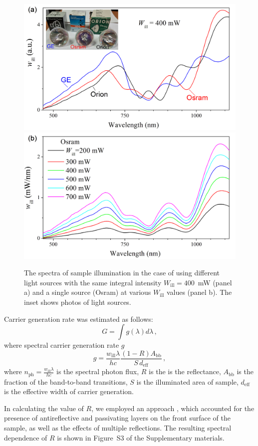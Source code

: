 \documentclass{WileyMSP-template}
\begin{document}
\begin{figure}
\centering
  \includegraphics[width=0.4\linewidth]{Fig4a.png}
  \includegraphics[width=0.4\linewidth]{Fig4b.png}
  \caption{
  The spectra of sample illumination in the case of using different light sources
  with the same integral intensity $W_\mathrm{ill}=400$~mW (panel a) and a single source (Osram)
 at various $W_\mathrm{ill}$ values (panel b).
 The inset shows photos of light sources.
}
  \label{fig4}
\end{figure}


Carrier generation rate was estimated as follows:
\begin{equation}
\label{eqGint}
G=\int g(\lambda) d\lambda\,,
\end{equation}
where spectral carrier generation rate $g$
\begin{equation}
\label{eqGspectr}
g=\frac{w_\mathrm{ill}\lambda}{hc}\frac{(1-R)A_\mathrm{bb}}{S\,d_\mathrm{eff}}\,,
\end{equation}
where $n_\mathrm{ph}=\frac{w_\mathrm{ill}\lambda}{hc}$ is the spectral photon flux,
$R$ is the is the reflectance,
$A_\mathrm{bb}$ is the fraction of the band-to-band transitions,
$S$ is the illuminated area of sample,
$d_\mathrm{eff}$ is the effective width of carrier generation.

In calculating the value of $R$, we employed an approach \cite{KostRefl2000},
which accounted for the presence of antireflective and passivating layers on the front surface of the sample,
as well as the effects of multiple reflections.
The resulting spectral dependence of $R$ is shown in Figure~S3 of the Supplementary materials.
\end{document}
